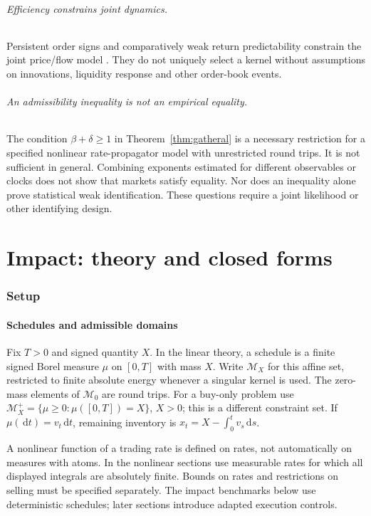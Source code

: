 \documentclass[11pt]{article}
\numberwithin{equation}{section}
\theoremstyle{definition}
\theoremstyle{remark}
\theoremstyle{definition}
\newcommand{\dd}{\,\mathrm d}
\begin{document}
\paragraph{Efficiency constrains joint dynamics.}
Persistent order signs and comparatively weak return predictability constrain the
joint price/flow model \citep{bouchaud2004,bouchaud2018}. They do not uniquely
select a kernel without assumptions on innovations, liquidity response and other
order-book events.

\paragraph{An admissibility inequality is not an empirical equality.}
The condition $\beta+\delta\geq1$ in Theorem~\ref{thm:gatheral} is a necessary
restriction for a specified nonlinear rate-propagator model with unrestricted
round trips. It is not sufficient in general. Combining exponents estimated for
different observables or clocks does not show that markets satisfy equality.
Nor does an inequality alone prove statistical weak identification. These
questions require a joint likelihood or other identifying design.

\part{Impact: theory and closed forms}\label{pt:theory}
\section{Setup}\label{sec:setup}

\subsection{Schedules and admissible domains}
Fix $T>0$ and signed quantity $X$. In the linear theory, a schedule is a finite
signed Borel measure $\mu$ on $[0,T]$ with mass $X$. Write $\mathcal M_X$ for
this affine set, restricted to finite absolute energy whenever a singular kernel
is used. The zero-mass elements of $\mathcal M_0$ are round trips. For a buy-only
problem use $\mathcal M_X^+=\{\mu\geq0:\mu([0,T])=X\}$, $X>0$; this is a
different constraint set. If $\mu(\dd t)=v_t\dd t$, remaining inventory is
$x_t=X-\int_0^t v_s\dd s$.

A nonlinear function of a trading rate is defined on rates, not automatically on
measures with atoms. In the nonlinear sections use measurable rates for which
all displayed integrals are absolutely finite. Bounds on rates and restrictions
on selling must be specified separately. The impact benchmarks below use
deterministic schedules; later sections introduce adapted execution controls.
\end{document}
